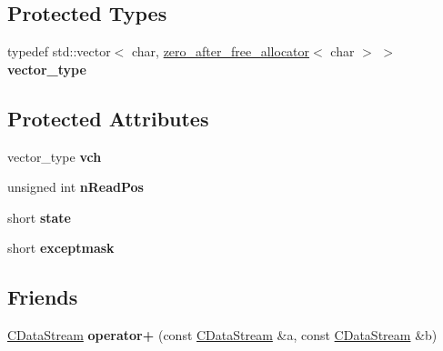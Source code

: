 \subsection*{Protected Types}
\begin{DoxyCompactItemize}
\item 
\mbox{\label{class_c_data_stream_ac27e68d9caf63cfd8ffe98bbad01b380}} 
typedef std\+::vector$<$ char, \mbox{\hyperlink{structzero__after__free__allocator}{zero\+\_\+after\+\_\+free\+\_\+allocator}}$<$ char $>$ $>$ {\bfseries vector\+\_\+type}
\end{DoxyCompactItemize}
\subsection*{Protected Attributes}
\begin{DoxyCompactItemize}
\item 
\mbox{\label{class_c_data_stream_ac875adb8c720c48abd1a7c82f3452dda}} 
vector\+\_\+type {\bfseries vch}
\item 
\mbox{\label{class_c_data_stream_af1c6a23b6725406d8f3464036a595556}} 
unsigned int {\bfseries n\+Read\+Pos}
\item 
\mbox{\label{class_c_data_stream_a45d5d8e33a27a84f26038b898adf3d43}} 
short {\bfseries state}
\item 
\mbox{\label{class_c_data_stream_a81a6caf76267890a0f602185deb028d4}} 
short {\bfseries exceptmask}
\end{DoxyCompactItemize}
\subsection*{Friends}
\begin{DoxyCompactItemize}
\item 
\mbox{\label{class_c_data_stream_ae9d127e586618900bc753dfda97e9401}} 
\mbox{\hyperlink{class_c_data_stream}{C\+Data\+Stream}} {\bfseries operator+} (const \mbox{\hyperlink{class_c_data_stream}{C\+Data\+Stream}} \&a, const \mbox{\hyperlink{class_c_data_stream}{C\+Data\+Stream}} \&b)
\end{DoxyCompactItemize}


